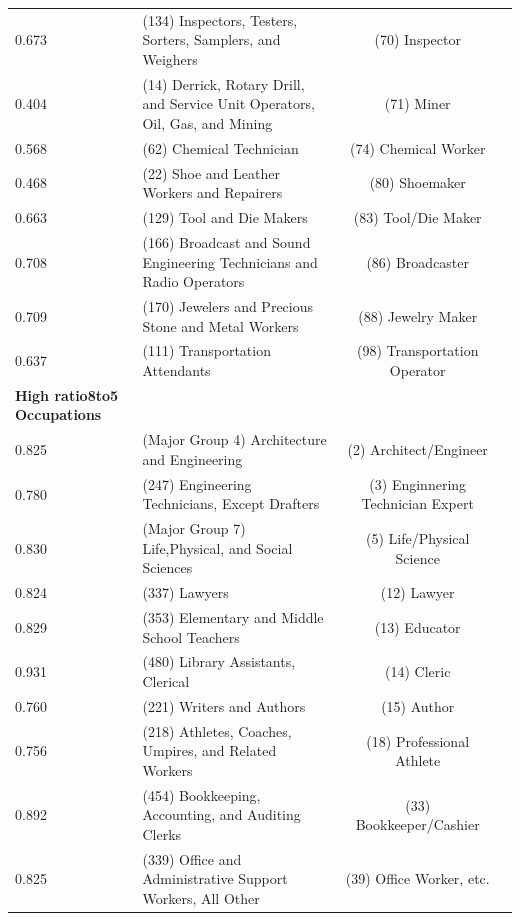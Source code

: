 \begin{table}[!htbp]
{{\begin{tabular}{llcc}
 0.673 &  (134) Inspectors, Testers, Sorters, Samplers, and Weighers &(70) Inspector\\[.5em]
 0.404 &  (14) Derrick, Rotary Drill, and Service Unit Operators, Oil, Gas, and Mining &(71) Miner\\[.5em]
 0.568 &  (62) Chemical Technician &(74) Chemical Worker\\[.5em]

 0.468 &  (22) Shoe and Leather Workers and Repairers &(80) Shoemaker\\[.5em]
 0.663 &  (129) Tool and Die Makers &(83) Tool/Die Maker\\[.5em]
 0.708 & (166)  Broadcast and Sound Engineering Technicians and Radio Operators &(86) Broadcaster\\[.5em]
 0.709 & (170) Jewelers and Precious Stone and Metal Workers &(88) Jewelry Maker\\[.5em]

 0.637 & (111) Transportation Attendants &(98) Transportation Operator\\[.5em]

\textbf{High ratio8to5 Occupations} &   \\[.5em]


 0.825  &    (Major Group 4)  Architecture and Engineering   &(2) Architect/Engineer\\[.5em]
 0.780  & (247) Engineering Technicians, Except Drafters &(3) Enginnering Technician Expert\\[.5em]
 0.830       & (Major Group 7) Life,Physical, and Social Sciences                                                &(5) Life/Physical Science\\[.5em]

 0.824  &  (337) Lawyers                                  &(12) Lawyer\\[.5em]
 0.829  &  (353) Elementary and Middle School Teachers  &(13) Educator\\[.5em]
 0.931  &  (480) Library Assistants, Clerical  &(14) Cleric\\[.5em]
 0.760  &  (221) Writers and Authors  &(15) Author\\[.5em]
 0.756  &  (218) Athletes, Coaches, Umpires, and Related Workers  &(18) Professional Athlete\\[.5em]

 0.892 &  (454) Bookkeeping, Accounting, and Auditing Clerks         &(33) Bookkeeper/Cashier\\[.5em]
 0.825 &  (339) Office and Administrative Support Workers, All Other &(39) Office Worker, etc.\\[.5em]


\end{tabular}}}
\end{table}
